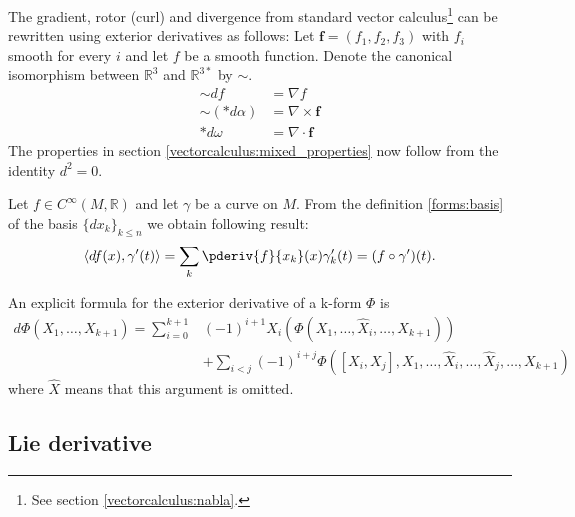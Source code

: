     \begin{remark}[$\dag$]\label{forms:vector_calculus}
        The gradient, rotor (curl) and divergence from standard vector calculus\footnote{See section \ref{vectorcalculus:nabla}.} can be rewritten using exterior derivatives as follows: Let $\mathbf{f} = (f_1, f_2, f_3)$ with $f_i$ smooth for every $i$ and let $f$ be a smooth function. Denote the canonical isomorphism between $\mathbb{R}^3$ and $\mathbb{R}^{3*}$ by $\sim$.
        \begin{align}
            \sim df &= \nabla f \\
            \sim (\ast d\alpha) &= \nabla\times\mathbf{f} \\
            \ast d\omega &= \nabla\cdot\mathbf{f}
        \end{align}
        The properties in section \ref{vectorcalculus:mixed_properties} now follow from the identity $d^2 = 0$.
    \end{remark}

    \begin{example}
        Let $f\in C^\infty(M, \mathbb{R})$ and let $\gamma$ be a curve on $M$. From the definition \ref{forms:basis} of the basis $\{dx_k\}_{k\leq n}$ we obtain following result:
        \begin{gather}
            \langle df(x), \gamma'(t) \rangle = \sum_k \pderiv{f}{x_k}(x)\gamma_k'(t) = (f\circ\gamma')(t).
        \end{gather}
    \end{example}

    \begin{example}
        An explicit formula for the exterior derivative of a k-form $\Phi$ is
        \begin{align}
            d\Phi(X_1,\ldots, X_{k+1}) = \sum_{i=0}^{k+1} &(-1)^{i+1} X_i(\Phi(X_1,\ldots, \hat{X}_i,\ldots, X_{k+1}))\nonumber\\
            \label{forms:k_form_exterior_derivative}
            &+\sum_{i<j} (-1)^{i+j}\Phi([X_i, X_j], X_1,\ldots, \hat{X}_i,\ldots, \hat{X}_j,\ldots, X_{k+1})
        \end{align}
        where $\hat{X}$ means that this argument is omitted.
    \end{example}

\subsection{Lie derivative}

